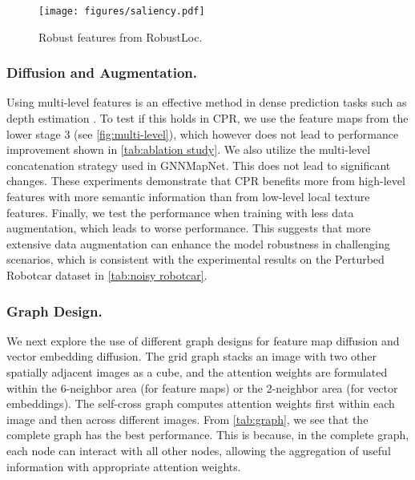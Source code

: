 \documentclass[letterpaper]{article} \usepackage{aaai23}  \usepackage{times}  \usepackage{helvet}  \usepackage{courier}  \usepackage[hyphens]{url}  \usepackage{graphicx} \urlstyle{rm} \def\UrlFont{\rm}  \usepackage{natbib}  \usepackage{caption} \frenchspacing  \setlength{\pdfpagewidth}{8.5in} \setlength{\pdfpageheight}{11in} \usepackage{booktabs}
\theoremstyle{remark}
\theoremstyle{plain}
\begin{document}
\begin{figure}[!t]
\begin{center}
\texttt{[image: figures/saliency.pdf]}
\end{center}
\caption{Robust features from RobustLoc. }
\label{fig:salience}
\end{figure}


\subsubsection{Diffusion and Augmentation.}
Using multi-level features is an effective method in dense prediction tasks such as depth estimation \cite{yan2021cadepth}. To test if this holds in CPR, we use the feature maps from the lower stage 3 (see \cref{fig:multi-level}), which however does not lead to performance improvement shown in \cref{tab:ablation study}. We also utilize the multi-level concatenation strategy used in GNNMapNet. This does not lead to significant changes. These experiments demonstrate that CPR benefits more from high-level features with more semantic information than from low-level local texture features. Finally, we test the performance when training with less data augmentation, which leads to worse performance. This suggests that more extensive data augmentation can enhance the model robustness in challenging scenarios, which is consistent with the experimental results on the Perturbed Robotcar dataset in \cref{tab:noisy robotcar}. 






\subsubsection{Graph Design.}
We next explore the use of different graph designs for feature map diffusion and vector embedding diffusion. The grid graph stacks an image with two other spatially adjacent images as a cube, and the attention weights are formulated within the 6-neighbor area (for feature maps) or the 2-neighbor area (for vector embeddings). The self-cross graph computes attention weights first within each image and then across different images. From \cref{tab:graph}, we see that the complete graph has the best performance. This is because, in the complete graph, each node can interact with all other nodes, allowing the aggregation of useful information with appropriate attention weights.
\end{document}
